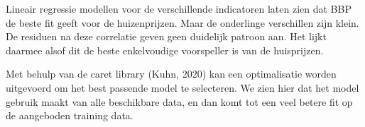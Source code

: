 \documentclass[
]{article}
\newenvironment{Shaded}{\begin{snugshade}}{\end{snugshade}}
\newcommand{\CommentTok}[1]{\textcolor[rgb]{0.56,0.35,0.01}{\textit{#1}}}
\newcommand{\DecValTok}[1]{\textcolor[rgb]{0.00,0.00,0.81}{#1}}
\newcommand{\KeywordTok}[1]{\textcolor[rgb]{0.13,0.29,0.53}{\textbf{#1}}}
\newcommand{\NormalTok}[1]{#1}
\newcommand{\OperatorTok}[1]{\textcolor[rgb]{0.81,0.36,0.00}{\textbf{#1}}}
\newcommand{\StringTok}[1]{\textcolor[rgb]{0.31,0.60,0.02}{#1}}
\begin{document}
\begin{Shaded}
\end{Shaded}

Lineair regressie modellen voor de verschillende indicatoren laten zien
dat BBP de beste fit geeft voor de huizenprijzen. Maar de onderlinge
verschillen zijn klein. De residuen na deze correlatie geven geen
duidelijk patroon aan. Het lijkt daarmee alsof dit de beste enkelvoudige
voorspeller is van de huisprijzen.

Met behulp van de caret library (Kuhn, 2020) kan een optimalisatie
worden uitgevoerd om het best passende model te selecteren. We zien hier
dat het model gebruik maakt van alle beschikbare data, en dan komt tot
een veel betere fit op de aangeboden training data.
\end{document}
